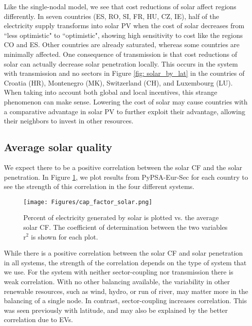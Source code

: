 \documentclass[lettersize,journal]{IEEEtran}
\begin{document}
Like the single-nodal model, we see that cost reductions of solar affect regions differently. In seven countries (ES, RO, SI, FR, HU, CZ, IE), half of the electricity supply transforms into solar PV when the cost of solar decreases from ``less optimistic" to ``optimistic", showing high sensitivity to cost like the regions CO and ES. Other countries are already saturated, whereas some countries are minimally affected. One consequence of transmission is that cost reductions of solar can actually decrease solar penetration locally. This occurs in the system with transmission and no sectors in Figure \ref{fig: solar_by_lat} in the countries of Croatia (HR), Montenegro (MK), Switzerland (CH), and Luxembourg (LU). When taking into account both global and local incentives, this strange phenomenon can make sense. Lowering the cost of solar may cause countries with a comparative advantage in solar PV to further exploit their advantage, allowing their neighbors to invest in other resources.





\subsection{Average solar quality}
We expect there to be a positive correlation between the solar CF and the solar penetration. In Figure \ref{fig: solar_by_solarcf}, we plot results from PyPSA-Eur-Sec for each country to see the strength of this correlation in the four different systems.


\begin{figure}[H]
\centering
\texttt{[image: Figures/cap\_factor\_solar.png]}

\caption{ Percent of electricity generated by solar is plotted vs. the average solar CF. The coefficient of determination between the two variables r$^2$ is shown for each plot. } 
\label{fig: solar_by_solarcf} 
\end{figure}

While there is a positive correlation between the solar CF and solar penetration in all systems, the strength of the correlation depends on the type of system that we use. For the system with neither sector-coupling nor transmission there is weak correlation. With no other balancing available, the variability in other renewable resources, such as wind, hydro, or run of river, may matter more in the balancing of a single node. In contrast, sector-coupling increases correlation. This was seen previously with latitude, and may also be explained by the better correlation due to EVs.
\end{document}

